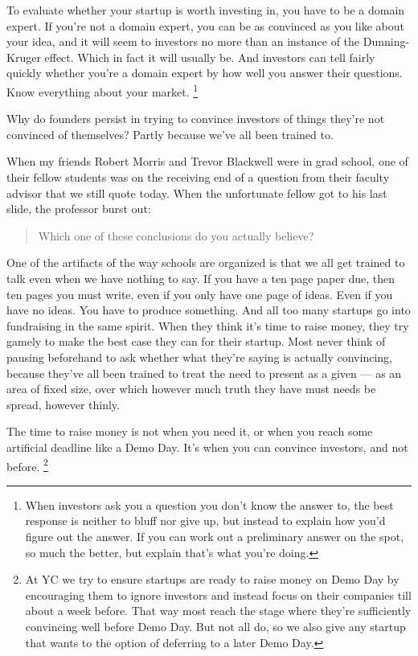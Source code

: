 To evaluate whether your startup is worth investing in, you have to be a
domain expert. If you're not a domain expert, you can be as convinced as
you like about your idea, and it will seem to investors no more than an
instance of the Dunning-Kruger effect. Which in fact it will usually be.
And investors can tell fairly quickly whether you're a domain expert by
how well you answer their questions. Know everything about your market.
\footnote{When investors ask you a question you don't know the answer to,
the best response is neither to bluff nor give up, but instead to
explain how you'd figure out the answer. If you can work out a
preliminary answer on the spot, so much the better, but explain that's
what you're doing.}

Why do founders persist in trying to convince investors of things
they're not convinced of themselves? Partly because we've all been
trained to.

When my friends Robert Morris and Trevor Blackwell were in grad school,
one of their fellow students was on the receiving end of a question from
their faculty advisor that we still quote today. When the unfortunate
fellow got to his last slide, the professor burst out:

\begin{quote}
Which one of these conclusions do you actually believe?
\end{quote}

One of the artifacts of the way schools are organized is that we all get
trained to talk even when we have nothing to say. If you have a ten page
paper due, then ten pages you must write, even if you only have one page
of ideas. Even if you have no ideas. You have to produce something. And
all too many startups go into fundraising in the same spirit. When they
think it's time to raise money, they try gamely to make the best case
they can for their startup. Most never think of pausing beforehand to
ask whether what they're saying is actually convincing, because they've
all been trained to treat the need to present as a given --- as an area
of fixed size, over which however much truth they have must needs be
spread, however thinly.

The time to raise money is not when you need it, or when you reach some
artificial deadline like a Demo Day. It's when you can convince
investors, and not before. \footnote{At YC we try to ensure startups are ready to raise money on Demo
Day by encouraging them to ignore investors and instead focus on their
companies till about a week before. That way most reach the stage where
they're sufficiently convincing well before Demo Day. But not all do, so
we also give any startup that wants to the option of deferring to a
later Demo Day.}

